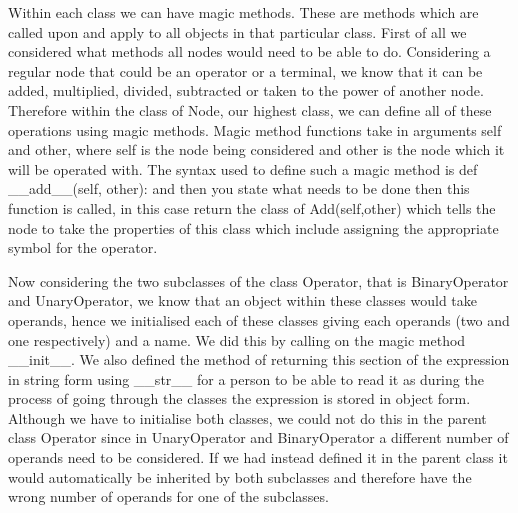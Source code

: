 \documentclass[12pt]{article}
\begin{document}
Within each class we can have magic methods. These are methods which are called upon and apply to all objects in that particular class. First of all we considered what methods all nodes would need to be able to do. Considering a regular node that could be an operator or a terminal, we know that it can be added, multiplied, divided, subtracted or taken to the power of another node. Therefore within the class of Node, our highest class, we can define all of these operations using magic methods. Magic method functions take in arguments self and other, where self is the node being considered and other is the node which it will be operated with. The syntax used to define such a magic method is def \_\_add\_\_(self, other): and then you state what needs to be done then this function is called, in this case return the class of Add(self,other) which tells the node to take the properties of this class which include assigning the appropriate symbol for the operator. 

Now considering the two subclasses of the class Operator, that is BinaryOperator and UnaryOperator, we know that an object within these classes would take operands, hence we initialised each of these classes giving each operands (two and one respectively) and a name. We did this by calling on the magic method \_\_init\_\_. We also defined the method of returning this section of the expression in string form using \_\_str\_\_ for a person to be able to read it as during the process of going through the classes the expression is stored in object form. Although we have to initialise both classes, we could not do this in the parent class Operator since in UnaryOperator and BinaryOperator a different number of operands need to be considered. If we had instead defined it in the parent class it would automatically be inherited by both subclasses and therefore have the wrong number of operands for one of the subclasses. 

\end{document}
